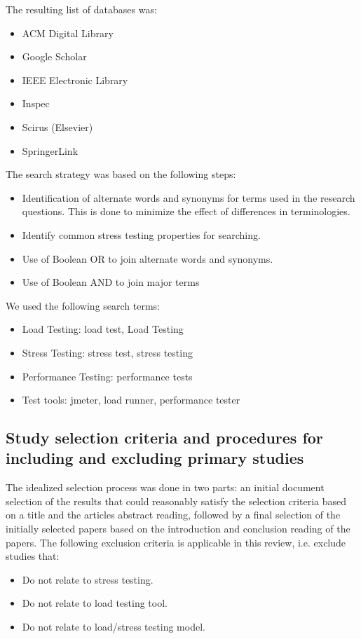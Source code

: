 \documentclass{report}
\begin{document}
The resulting list of databases was:

\begin{itemize}
\item  ACM Digital Library
\item  Google Scholar
\item  IEEE Electronic Library
\item  Inspec
\item  Scirus (Elsevier)
\item SpringerLink
\end{itemize}


The search strategy was based on the following steps:

\begin{itemize}
\item  Identification of alternate words and synonyms for terms used
in the research questions. This is done to minimize the effect
of differences in terminologies.
\item  Identify common stress testing properties for searching.
\item Use of Boolean OR to join alternate words and synonyms.
\item Use of Boolean AND to join major terms
\end{itemize}

We used the following search terms:

\begin{itemize}
\item Load Testing: load test, Load Testing
\item Stress Testing: stress test, stress testing
\item Performance Testing: performance tests
\item Test tools: jmeter, load runner, performance tester
\end{itemize}


\subsection{Study selection criteria and procedures for including and excluding
primary studies}

The idealized selection process was done in two parts: an initial document selection of the results that could reasonably satisfy the selection criteria based on a title and the articles abstract reading, followed by a final selection of the initially selected papers based on the introduction and conclusion reading of the papers. The following exclusion criteria is applicable in this review, i.e. exclude studies that:
\begin{itemize}
\item Do not relate to stress testing.
\item Do not relate to load testing tool.
\item Do not relate to load/stress testing model.
\end{itemize}
\end{document}
